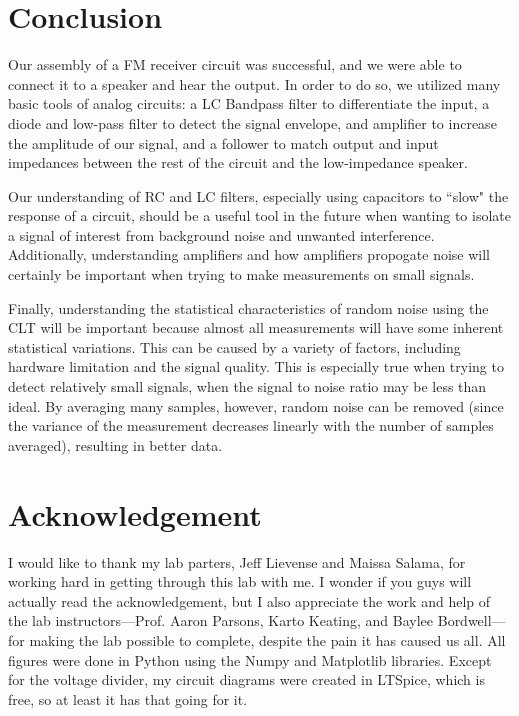 \documentclass[12pt]{article}
\begin{document}
\section*{Conclusion}
Our assembly of a FM receiver circuit was successful, and we were able to connect it to a speaker and hear the output. In order to do so, we utilized many basic tools of analog circuits: a LC Bandpass filter to differentiate the input, a diode and low-pass filter to detect the signal envelope, and amplifier to increase the amplitude of our signal, and a follower to match output and input impedances between the rest of the circuit and the low-impedance speaker.

Our understanding of RC and LC filters, especially using capacitors to ``slow" the response of a circuit, should be a useful tool in the future when wanting to isolate a signal of interest from background noise and unwanted interference. Additionally, understanding amplifiers and how amplifiers propogate noise will certainly be important when trying to make measurements on small signals.

Finally, understanding the statistical characteristics of random noise using the CLT will be important because almost all measurements will have some inherent statistical variations. This can be caused by a variety of factors, including hardware limitation and the signal quality. This is especially true when trying to detect relatively small signals, when the signal to noise ratio may be less than ideal. By averaging many samples, however, random noise can be removed (since the variance of the measurement decreases linearly with the number of samples averaged), resulting in better data.

\section*{Acknowledgement}
I would like to thank my lab parters, Jeff Lievense and Maissa Salama, for working hard in getting through this lab with me. I wonder if you guys will actually read the acknowledgement, but I also appreciate the work and help of the lab instructors---Prof. Aaron Parsons, Karto Keating, and Baylee Bordwell---for making the lab possible to complete, despite the pain it has caused us all.
All figures were done in Python using the Numpy and Matplotlib libraries.
Except for the voltage divider, my circuit diagrams were created in LTSpice, which is free, so at least it has that going for it.
\end{document}
